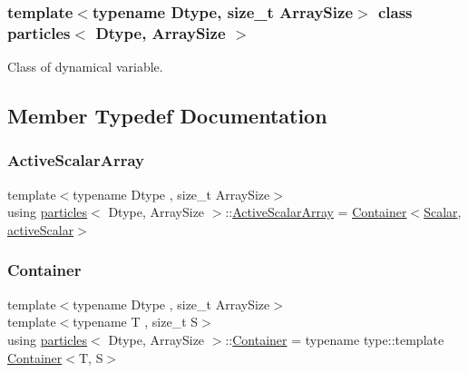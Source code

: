 \subsubsection*{template$<$typename Dtype, size\+\_\+t Array\+Size$>$\newline
class particles$<$ Dtype, Array\+Size $>$}

Class of dynamical variable. 

\subsection{Member Typedef Documentation}
\mbox{\label{classparticles_a1a7d26adb64aacc4201e6bbb9de64c47}} 
\subsubsection{\texorpdfstring{Active\+Scalar\+Array}{ActiveScalarArray}}
{\footnotesize\ttfamily template$<$typename Dtype , size\+\_\+t Array\+Size$>$ \\
using \mbox{\hyperlink{classparticles}{particles}}$<$ Dtype, Array\+Size $>$\+::\mbox{\hyperlink{classparticles_a1a7d26adb64aacc4201e6bbb9de64c47}{Active\+Scalar\+Array}} =  \mbox{\hyperlink{classparticles_a697aa55d257e7dea480460f042c91480}{Container}}$<$\mbox{\hyperlink{classparticles_a57a6b6582045a4b20742b99c513e9f63}{Scalar}}, \mbox{\hyperlink{classparticles_ae1bbd3d94802cc0b3dc84b473a0115ab}{active\+Scalar}}$>$}

\mbox{\label{classparticles_a697aa55d257e7dea480460f042c91480}} 
\subsubsection{\texorpdfstring{Container}{Container}}
{\footnotesize\ttfamily template$<$typename Dtype , size\+\_\+t Array\+Size$>$ \\
template$<$typename T , size\+\_\+t S$>$ \\
using \mbox{\hyperlink{classparticles}{particles}}$<$ Dtype, Array\+Size $>$\+::\mbox{\hyperlink{classparticles_a697aa55d257e7dea480460f042c91480}{Container}} =  typename type\+::template \mbox{\hyperlink{classparticles_a697aa55d257e7dea480460f042c91480}{Container}}$<$T, S$>$}

